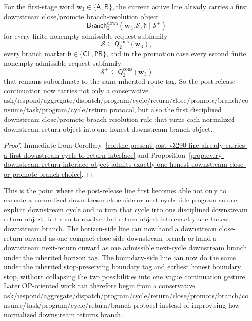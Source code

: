 \begin{corollary}
\label{cor:the-present-post-v3290-line-already-carries-a-first-downstream-close-promote-branch-resolution-rule}
For the first-stage word \(\mathbf w_3\in\{\mathsf A,\mathsf B\}\), the current active line already carries a first downstream close/promote branch-resolution object
\[
  \mathsf{Branch}^{\mathrm{down}}_{2}(\mathbf w_3;\mathcal S,\mathfrak b\mid\mathcal S^{+})
\]
for every finite nonempty admissible request subfamily
\[
  \mathcal S\subseteq \mathsf{Q}^{\mathrm{cons}}_{2}(\mathbf w_3),
\]
every branch marker \(\mathfrak b\in\{\mathsf{CL},\mathsf{PR}\}\), and in the promotion case every second finite nonempty admissible request subfamily
\[
  \mathcal S^{+}\subseteq \mathsf{Q}^{\mathrm{cons}}_{2}(\mathbf w_3)
\]
that remains subordinate to the same inherited route tag. So the post-release continuation now carries not only a conservative ask/respond/aggregate/dispatch/program/cycle/return/close/promote/branch/consume/task/program/cycle/return protocol, but also the first disciplined downstream close/promote branch-resolution rule that turns each normalized downstream return object into one honest downstream branch object.
\end{corollary}

\begin{proof}
Immediate from Corollary~\ref{cor:the-present-post-v3290-line-already-carries-a-first-downstream-cycle-to-return-interface} and Proposition~\ref{prop:every-downstream-return-interface-object-admits-exactly-one-honest-downstream-close-or-promote-branch-choice}.
\end{proof}

\begin{remark}
\label{rem:what-the-first-downstream-close-promote-branch-resolution-rule-now-buys}
This is the point where the post-release line first becomes able not only to execute a normalized downstream close-side or next-cycle-side program as one explicit downstream cycle and to turn that cycle into one disciplined downstream return object, but also to resolve that return object into exactly one honest downstream branch. The horizon-side line can now hand a downstream close-return onward as one compact close-side downstream branch or hand a downstream next-return onward as one admissible next-cycle downstream branch under the inherited horizon tag. The boundary-side line can now do the same under the inherited stop-preserving boundary tag and earliest honest boundary stop, without collapsing the two possibilities into one vague continuation gesture. Later OP-oriented work can therefore begin from a conservative ask/respond/aggregate/dispatch/program/cycle/return/close/promote/branch/consume/task/program/cycle/return/branch protocol instead of improvising how normalized downstream returns branch.
\end{remark}



